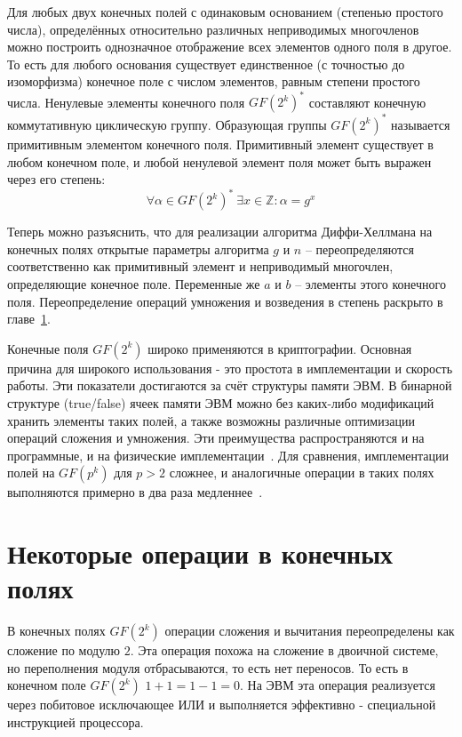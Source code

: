 \documentclass[times,specification,annotation]{itmo-student-thesis}
\begin{document}
Для любых двух конечных полей с одинаковым основанием (степенью простого числа), определённых относительно различных
неприводимых многочленов можно построить однозначное отображение всех элементов одного поля в другое.
То есть для любого основания существует единственное (с точностью до изоморфизма) конечное поле с числом
элементов, равным степени простого числа.
Ненулевые элементы конечного поля $GF(2^k)^*$ составляют конечную коммутативную циклическую группу.
Образующая группы $GF(2^k)^*$ называется примитивным элементом конечного поля.
Примитивный элемент существует в любом конечном поле, и любой ненулевой элемент поля может быть выражен через его степень:
\[\forall \alpha \in GF(2^k)^* ~ \exists x \in \mathbb{Z}: \alpha = g^x\]

Теперь можно разъяснить, что для реализации алгоритма Диффи-Хеллмана на конечных полях открытые параметры алгоритма
$g$ и $n$ -- переопределяются соответственно как примитивный элемент и неприводимый многочлен, определяющие конечное поле.
Переменные же $a$ и $b$ -- элементы этого конечного поля.
Переопределение операций умножения и возведения в степень раскрыто в главе~\ref{sec:oper}.

Конечные поля $GF(2^k)$ широко применяются в криптографии.
Основная причина для широкого использования - это простота в имплементации и скорость работы.
Эти показатели достигаются за счёт структуры памяти ЭВМ.
В бинарной структуре (true/false) ячеек памяти ЭВМ можно без каких-либо модификаций хранить элементы
таких полей, а также возможны различные оптимизации операций сложения и умножения.
Эти преимущества распространяются и на программные, и на физические имплементации~\cite{koc98}.
Для сравнения, имплементации полей на $GF(p^k)$ для $p > 2$ сложнее, и аналогичные операции в таких полях выполняются
примерно в два раза медленнее~\cite{mau15}.


\section{Некоторые операции в конечных полях}\label{sec:oper}

В конечных полях $GF(2^k)$ операции сложения и вычитания переопределены как сложение по модулю $2$.
Эта операция похожа на сложение в двоичной системе, но переполнения модуля отбрасываются, то есть нет переносов.
То есть в конечном поле $GF(2^k)$ $1+1 = 1-1 = 0$.
На ЭВМ эта операция реализуется через побитовое исключающее ИЛИ и выполняется эффективно - специальной инструкцией процессора.
\end{document}
